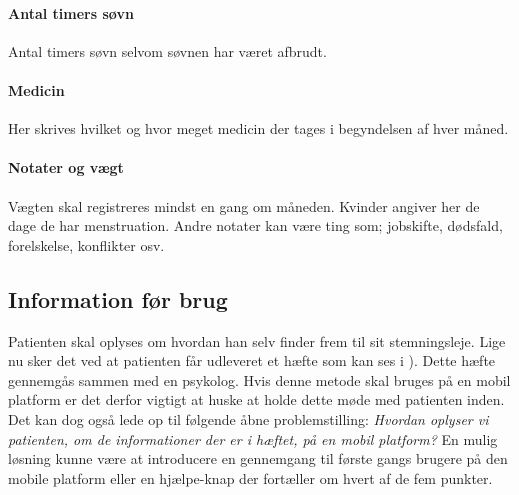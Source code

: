 \paragraph{Antal timers søvn}
Antal timers søvn selvom søvnen har været afbrudt.

\paragraph{Medicin}
Her skrives hvilket og hvor meget medicin der tages i begyndelsen af hver måned.

\paragraph{Notater og vægt} 
Vægten skal registreres mindst en gang om måneden.
Kvinder angiver her de dage de har menstruation.
Andre notater kan være ting som; jobskifte, dødsfald, forelskelse, konflikter osv.

\subsection{Information før brug}
Patienten skal oplyses om hvordan han selv finder frem til sit stemningsleje.
Lige nu sker det ved at patienten får udleveret et hæfte som kan ses i \citet[Appendiks F, Stemningsregistrering]{faelles}).
Dette hæfte gennemgås sammen med en psykolog.
Hvis denne metode skal bruges på en mobil platform er det derfor vigtigt at huske at holde dette møde med patienten inden.
Det kan dog også lede op til følgende åbne problemstilling: \textit{Hvordan oplyser vi patienten, om de informationer der er i hæftet, på en mobil platform?}
En mulig løsning kunne være at introducere en gennemgang til første gangs brugere på den mobile platform eller en hjælpe-knap der fortæller om hvert af de fem punkter.
